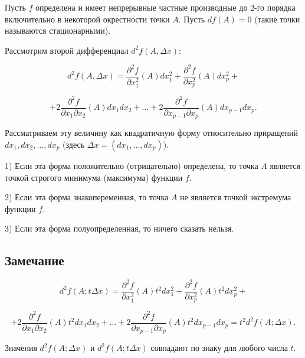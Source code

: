 {Пусть \( f \) определена и имеет непрерывные частные производные до 2-го порядка включительно в некоторой окрестности точки \( A \). Пусть \( df(A) = 0 \) (такие точки называются стационарными).

Рассмотрим второй дифференциал \( d^2f(A, \Delta x) \):



\[
d^2f(A, \Delta x) = \frac{\partial^2 f}{\partial x_1^2}(A)dx_1^2 + \frac{\partial^2 f}{\partial x_p^2}(A)dx_p^2 +
\]





\[
+ 2 \frac{\partial^2 f}{\partial x_1 \partial x_2}(A)dx_1 dx_2 + \ldots + 2 \frac{\partial^2 f}{\partial x_{p-1} \partial x_p}(A)dx_{p-1}dx_p.
\]



Рассматриваем эту величину как квадратичную форму относительно приращений \( dx_1, dx_2, \ldots, dx_p \) (здесь \( \Delta x = (dx_1, \ldots, dx_p) \)).

1) Если эта форма положительно (отрицательно) определена, то точка \( A \) является точкой строгого минимума (максимума) функции \( f \).

2) Если эта форма знакопеременная, то точка \( A \) не является точкой экстремума функции \( f \).

3) Если эта форма полуопределенная, то ничего сказать нельзя.

\subsection*{Замечание}



\[
d^2f(A; t \Delta x) = \frac{\partial^2 f}{\partial x_1^2}(A)t^2 dx_1^2 + \frac{\partial^2 f}{\partial x_p^2}(A)t^2 dx_p^2 +
\]





\[
+ 2 \frac{\partial^2 f}{\partial x_1 \partial x_2}(A)t^2 dx_1 dx_2 + \ldots + 2 \frac{\partial^2 f}{\partial x_{p-1} \partial x_p}(A)t^2 dx_{p-1}dx_p = t^2 d^2f(A; \Delta x).
\]



Значения \( d^2f(A; \Delta x) \) и \( d^2f(A; t \Delta x) \) совпадают по знаку для любого числа \( t \).


}